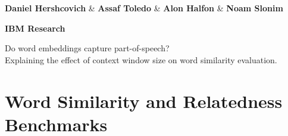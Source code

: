 \documentclass[extrafontsizes,60pt,twocolumn]{memoir}
\begin{document}
\setlength{\columnseprule}{1pt}

\begin{strip}
  \begin{center}
  \end{center}
  \begin{center}
  \begin{minipage}[b]{.9\linewidth}
    \centering
    \begin{minipage}{.8\linewidth}
      \HUGE\textbf{Daniel Hershcovich} \& \textbf{Assaf Toledo} \& \textbf{Alon Halfon} \& \textbf{Noam Slonim}
    \end{minipage}
    \hfill
    \begin{minipage}{.15\linewidth}
      \HUGE\textbf{IBM Research}
    \end{minipage}
    
    \vspace{.5in}
    \titlespacing*{\section}{0pt}{8mm}{.5in}
    \begin{adjustbox}{margin=.5in,frame,minipage=\textwidth,center,color=purple,cfbox=green}
      \centering\huge
      Do word embeddings capture part-of-speech? \\
      Explaining the effect of context window size on word similarity evaluation.
    \end{adjustbox}
  \end{minipage}
  \end{center}
\end{strip}


\section*{Word Similarity and Relatedness Benchmarks}
\end{document}
